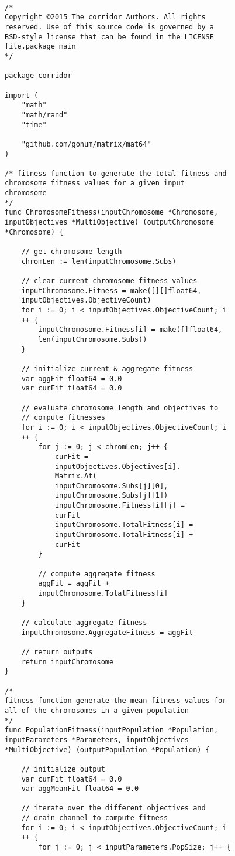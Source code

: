 \begin{lstlisting}[basicstyle=\small]

/* 
Copyright ©2015 The corridor Authors. All rights 
reserved. Use of this source code is governed by a 
BSD-style license that can be found in the LICENSE 
file.package main
*/

package corridor

import (
	"math"
	"math/rand"
	"time"

	"github.com/gonum/matrix/mat64"
)

/* fitness function to generate the total fitness and 
chromosome fitness values for a given input 
chromosome
*/
func ChromosomeFitness(inputChromosome *Chromosome, 
inputObjectives *MultiObjective) (outputChromosome 
*Chromosome) {

	// get chromosome length
	chromLen := len(inputChromosome.Subs)

	// clear current chromosome fitness values
	inputChromosome.Fitness = make([][]float64, 
	inputObjectives.ObjectiveCount)
	for i := 0; i < inputObjectives.ObjectiveCount; i
	++ {
		inputChromosome.Fitness[i] = make([]float64, 
		len(inputChromosome.Subs))
	}

	// initialize current & aggregate fitness
	var aggFit float64 = 0.0
	var curFit float64 = 0.0

	// evaluate chromosome length and objectives to 
	// compute fitnesses
	for i := 0; i < inputObjectives.ObjectiveCount; i
	++ {
		for j := 0; j < chromLen; j++ {
			curFit = 
			inputObjectives.Objectives[i].
			Matrix.At(
			inputChromosome.Subs[j][0],
			inputChromosome.Subs[j][1])
			inputChromosome.Fitness[i][j] = 
			curFit
			inputChromosome.TotalFitness[i] = 
			inputChromosome.TotalFitness[i] + 
			curFit
		}

		// compute aggregate fitness
		aggFit = aggFit + 
		inputChromosome.TotalFitness[i]
	}

	// calculate aggregate fitness
	inputChromosome.AggregateFitness = aggFit

	// return outputs
	return inputChromosome
}

/* 
fitness function generate the mean fitness values for 
all of the chromosomes in a given population
*/
func PopulationFitness(inputPopulation *Population, 
inputParameters *Parameters, inputObjectives 
*MultiObjective) (outputPopulation *Population) {

	// initialize output
	var cumFit float64 = 0.0
	var aggMeanFit float64 = 0.0

	// iterate over the different objectives and 
	// drain channel to compute fitness
	for i := 0; i < inputObjectives.ObjectiveCount; i
	++ {
		for j := 0; j < inputParameters.PopSize; j++ {


\end{lstlisting}
